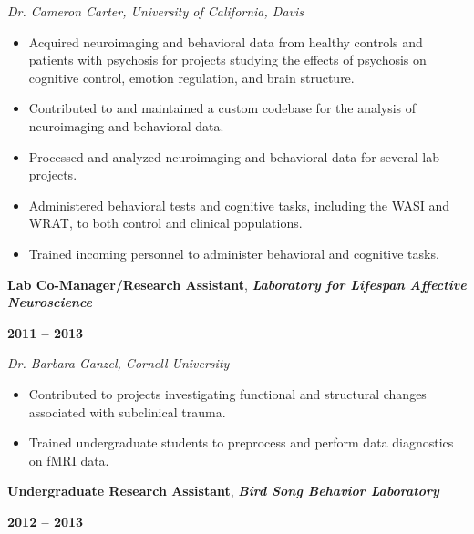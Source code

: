 \documentclass[10pt]{article}
\begin{document}
\emph{Dr. Cameron Carter, University of California, Davis}

\begin{itemize}[noitemsep, nolistsep]
\item
  Acquired neuroimaging and behavioral data from healthy controls and
  patients with psychosis for projects studying the effects of psychosis
  on cognitive control, emotion regulation, and brain structure.
\item
  Contributed to and maintained a custom codebase for the analysis of
  neuroimaging and behavioral data.
\item
  Processed and analyzed neuroimaging and behavioral data for several
  lab projects.
\item
  Administered behavioral tests and cognitive tasks, including the WASI
  and WRAT, to both control and clinical populations.
\item
  Trained incoming personnel to administer behavioral and cognitive
  tasks.
\end{itemize}

\bigskip

\begin{minipage}[t]{.85\linewidth}
\flushleft
\noindent
\textbf{Lab Co-Manager/Research Assistant}, \emph{\textbf{Laboratory for
Lifespan Affective Neuroscience}}
\end{minipage}
\hfill
\begin{minipage}[t]{.15\linewidth}
\flushright
\noindent
\textsc{\textbf{2011 -- 2013}}
\end{minipage}

\emph{Dr. Barbara Ganzel, Cornell University}

\begin{itemize}[noitemsep, nolistsep]
\item
  Contributed to projects investigating functional and structural
  changes associated with subclinical trauma.
\item
  Trained undergraduate students to preprocess and perform data
  diagnostics on fMRI data.
\end{itemize}

\bigskip

\begin{minipage}[t]{.85\linewidth}
\flushleft
\noindent
\textbf{Undergraduate Research Assistant}, \emph{\textbf{Bird Song Behavior
Laboratory}}
\end{minipage}
\hfill
\begin{minipage}[t]{.15\linewidth}
\flushright
\noindent
\textsc{\textbf{2012 -- 2013}}
\end{minipage}
\end{document}
